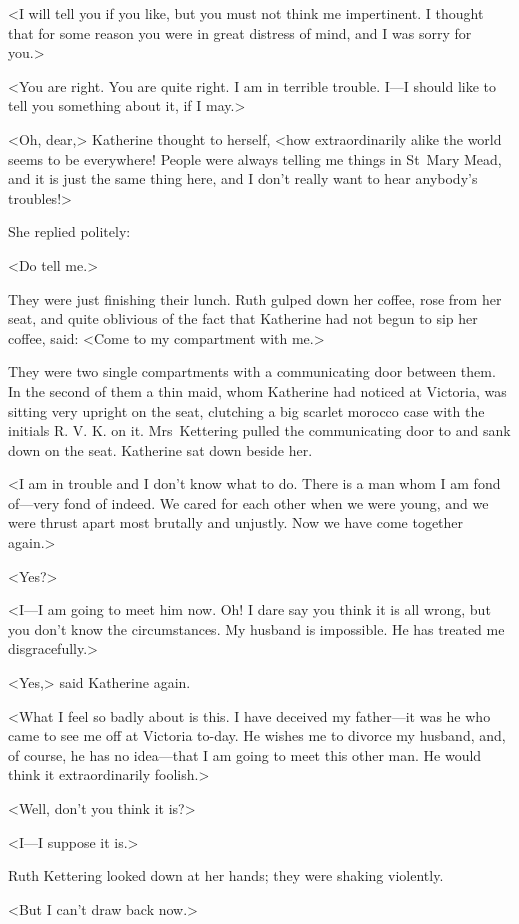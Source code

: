 <I will tell you if you like, but you must not think me impertinent. I thought that for some reason you were in great distress of mind, and I was sorry for you.>

<You are right. You are quite right. I am in terrible trouble. I—I should like to tell you something about it, if I may.>

<Oh, dear,> Katherine thought to herself, <how extraordinarily alike the world seems to be everywhere! People were always telling me things in St~Mary Mead, and it is just the same thing here, and I don't really want to hear anybody's troubles!>

She replied politely:

<Do tell me.>

They were just finishing their lunch. Ruth gulped down her coffee, rose from her seat, and quite oblivious of the fact that Katherine had not begun to sip her coffee, said: <Come to my compartment with me.>

They were two single compartments with a communicating door between them. In the second of them a thin maid, whom Katherine had noticed at Victoria, was sitting very upright on the seat, clutching a big scarlet morocco case with the initials R. V. K. on it. Mrs~Kettering pulled the communicating door to and sank down on the seat. Katherine sat down beside her.

<I am in trouble and I don't know what to do. There is a man whom I am fond of—very fond of indeed. We cared for each other when we were young, and we were thrust apart most brutally and unjustly. Now we have come together again.>

<Yes?>

<I—I am going to meet him now. Oh! I dare say you think it is all wrong, but you don't know the circumstances. My husband is impossible. He has treated me disgracefully.>

<Yes,> said Katherine again.

<What I feel so badly about is this. I have deceived my father—it was he who came to see me off at Victoria to-day. He wishes me to divorce my husband, and, of course, he has no idea—that I am going to meet this other man. He would think it extraordinarily foolish.>

<Well, don't you think it is?>

<I—I suppose it is.>

Ruth Kettering looked down at her hands; they were shaking violently.

<But I can't draw back now.>

